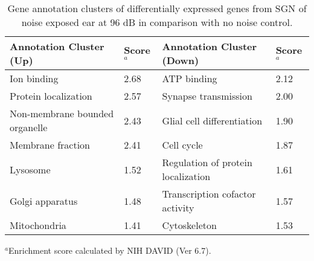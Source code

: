 \documentclass{article}
\begin{document}
\begin{table}
\caption{Gene annotation clusters of differentially expressed genes from SGN of noise exposed ear at 96 dB in comparison with no noise control.}
\begin{small}
\begin{tabular}{l l l l}
\hline
Annotation Cluster (Up) & Score$^a$ & Annotation Cluster (Down) &  Score$^a$ \\
\hline
Ion binding & 2.68 & ATP binding & 2.12 \\
Protein localization & 2.57 & Synapse transmission & 2.00 \\
Non-membrane bounded organelle & 2.43 & Glial cell differentiation & 1.90 \\
Membrane fraction & 2.41 & Cell cycle & 1.87 \\
Lysosome & 1.52 & Regulation of protein localization & 1.61\\
Golgi apparatus & 1.48 & Transcription cofactor activity & 1.57 \\
Mitochondria & 1.41 & Cytoskeleton & 1.53 \\
\hline
\end{tabular}
$^a$Enrichment score calculated by NIH DAVID (Ver 6.7).
\end{small}
\label{table:tab1}
\end{table}
\end{document}
